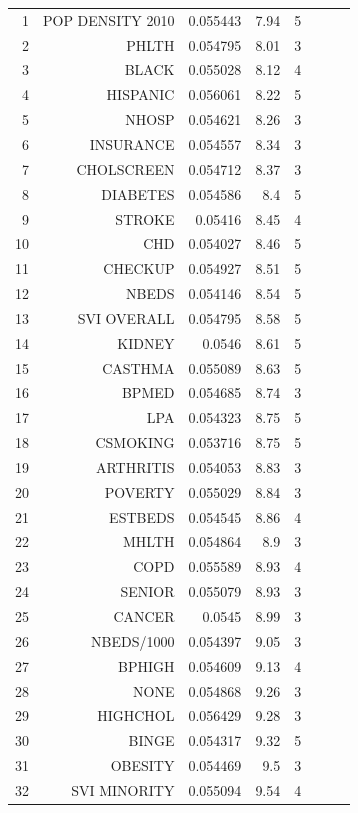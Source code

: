 \documentclass[a4paper, inpress]{jds} %
\renewcommand{\_}{%
    \textunderscore\hspace{0pt}%
}
\begin{document}
\begin{table}[!p]
\begin{tabular}{rrrrrlrl}
1	&	POP\_DENSITY\_2010	&	0.055443	&	7.94	&	5	 \\
2	&	PHLTH	&	0.054795	&	8.01	&	3	 \\
3	&	BLACK	&	0.055028	&	8.12	&	4	 \\
4	&	HISPANIC	&	0.056061	&	8.22	&	5	 \\
5	&	NHOSP	&	0.054621	&	8.26	&	3	 \\
6	&	INSURANCE	&	0.054557	&	8.34	&	3	 \\
7	&	CHOLSCREEN	&	0.054712	&	8.37	&	3	 \\
8	&	DIABETES	&	0.054586	&	8.4	&	5	 \\
9	&	STROKE	&	0.05416	&	8.45	&	4	 \\
10	&	CHD	&	0.054027	&	8.46	&	5	 \\
11	&	CHECKUP	&	0.054927	&	8.51	&	5	 \\
12	&	NBEDS	&	0.054146	&	8.54	&	5	 \\
13	&	SVI\_OVERALL	&	0.054795	&	8.58	&	5	 \\
14	&	KIDNEY	&	0.0546	&	8.61	&	5	 \\
15	&	CASTHMA	&	0.055089	&	8.63	&	5	 \\
16	&	BPMED	&	0.054685	&	8.74	&	3	 \\
17	&	LPA	&	0.054323	&	8.75	&	5	 \\
18	&	CSMOKING	&	0.053716	&	8.75	&	5	 \\
19	&	ARTHRITIS	&	0.054053	&	8.83	&	3	 \\
20	&	POVERTY	&	0.055029	&	8.84	&	3	 \\
21	&	ESTBEDS	&	0.054545	&	8.86	&	4	 \\
22	&	MHLTH	&	0.054864	&	8.9	&	3	 \\
23	&	COPD	&	0.055589	&	8.93	&	4	 \\
24	&	SENIOR	&	0.055079	&	8.93	&	3	 \\
25	&	CANCER	&	0.0545	&	8.99	&	3	 \\
26	&	NBEDS/1000	&	0.054397	&	9.05	&	3	 \\
27	&	BPHIGH	&	0.054609	&	9.13	&	4	 \\
\rowcolor{black!5} 28	&	NONE	&	0.054868	&	9.26	&	3	 \\
29	&	HIGHCHOL	&	0.056429	&	9.28	&	3	 \\
30	&	BINGE	&	0.054317	&	9.32	&	5	 \\
31	&	OBESITY	&	0.054469	&	9.5	&	3	 \\
32	&	SVI\_MINORITY	&	0.055094	&	9.54	&	4	 \\
\bottomrule
\end{tabular}
\end{table}
\end{document}
